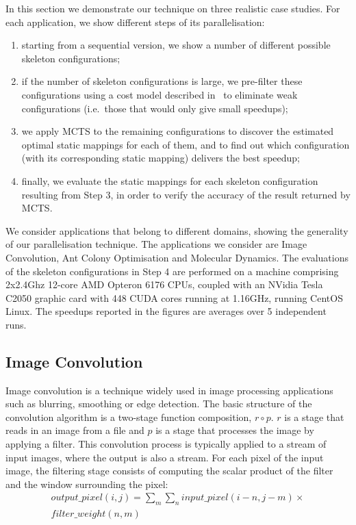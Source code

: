 \documentclass[smallextended]{svjour3}
\begin{document}
\noindent
In this section we demonstrate our technique on three
realistic case studies. For each application, we show different steps of
its parallelisation: 
\begin{enumerate}
\item starting from a sequential version, we
show a number of different possible skeleton configurations; 
\item if the number of skeleton configurations is
  large, we pre-filter these configurations using a cost model
described in~\cite{hlpp} to eliminate weak configurations
(i.e.\ those that would only give small speedups); 
\item we apply MCTS to the remaining configurations to discover the estimated optimal 
static mappings for each of them, and to find out which configuration
(with its corresponding static mapping) delivers the best speedup;
\item  finally, we evaluate the static mappings for each skeleton
configuration resulting from Step 3, in order to
verify the accuracy of the result returned by MCTS.
\end{enumerate} 

\noindent
We consider applications that belong to different domains, showing the
generality of our parallelisation technique. The applications we consider are
Image Convolution, Ant Colony
Optimisation and Molecular Dynamics. The evaluations of the skeleton
configurations in Step 4 are performed on a machine comprising 2x2.4Ghz 12-core 
AMD Opteron 6176 CPUs, coupled with an NVidia Tesla C2050 graphic card
with 448 CUDA cores running at 1.16GHz, running CentOS Linux. The speedups reported in the figures are
averages over 5 independent runs.


\subsection{Image Convolution}
\noindent
Image convolution is a technique widely used in image processing applications such as blurring, smoothing
or edge detection. 
The basic structure of the convolution algorithm is a two-stage function composition, $ r \circ p $.
$r$ is a stage that reads in an image from a file and $p$ is a stage
that processes the image by applying a filter. This
convolution process is typically applied to a stream of input images,
where the output is also a stream.
For each pixel of the input image, the filtering stage consists of computing the scalar product of the
filter and the window surrounding the pixel:
\begin{multline}
\label{eqn:01}
output\_pixel(i,j)=\sum_{m}\sum_{n} input\_pixel(i-n,j-m)\times\\
filter\_weight(n,m){}
\end{multline}
\end{document}
